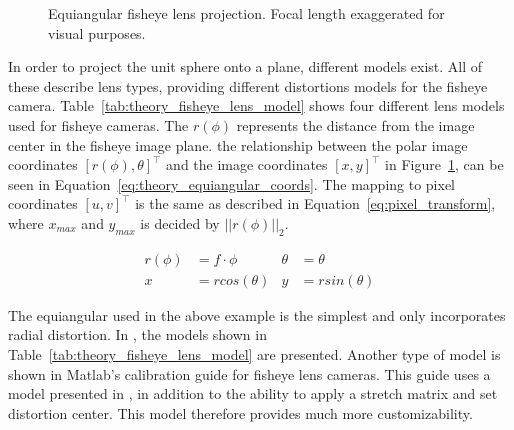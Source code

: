 \begin{figure}[!htb]
    
    \caption{Equiangular fisheye lens projection. Focal length exaggerated for visual purposes.}
    \label{fig:fisheye_spherical_projection}
\end{figure}

In order to project the unit sphere onto a plane, different models exist. All of these describe lens types, providing different distortions models for the fisheye camera. Table~\ref{tab:theory_fisheye_lens_model} shows four different lens models used for fisheye cameras. The $r(\phi)$ represents the distance from the image center in the fisheye image plane. the relationship between the polar image coordinates $[r(\phi), \theta]^\top$ and the image coordinates $[x,y]^\top$ in Figure~\ref{fig:fisheye_spherical_projection}, can be seen in Equation~\eqref{eq:theory_equiangular_coords}. The mapping to pixel coordinates $[u,v]^\top$ is the same as described in Equation~\eqref{eq:pixel_transform}, where $x_{max}$ and $y_{max}$ is decided by $||r(\phi)||_2$.

\begin{align}
    r(\phi) &= f \cdot \phi & \theta &= \theta \nonumber \\
    x &= rcos(\theta) & y &= rsin(\theta)
    \label{eq:theory_equiangular_coords}
\end{align}

The equiangular used in the above example is the simplest and only incorporates radial distortion. In \cite{FisheyeCorke}, the models shown in Table~\ref{tab:theory_fisheye_lens_model} are presented. Another type of model is shown in Matlab's calibration guide for fisheye lens cameras\cite{MatlabFish}. This guide uses a model presented in \cite{FisheyeKalibration}, in addition to the ability to apply a stretch matrix and set distortion center. This model therefore provides much more customizability.

